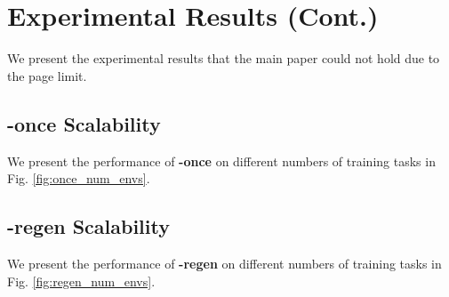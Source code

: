 
\clearpage


\clearpage
\appendix

\section{Experimental Results (Cont.)}
We present the experimental results that the main paper could not hold due to the page limit.

\subsection{\textbf{\agentshort{}-once} Scalability}
We present the performance of \textbf{\agentshort{}-once} on different numbers of training tasks in Fig. \ref{fig:once_num_envs}.

\begin{figure*}[htbp]
\centering
\hfill
{}
\hfill
{}
\hfill
{}
\hfill
{}

\caption{\small \textbf{Generalization Performance of \agentshort{}-once on different numbers of training tasks}: each error bar (95\% confidence interval) is obtained from $20$ independent seed runs.}
\label{fig:once_num_envs}
\end{figure*}

\subsection{\textbf{\agentshort{}-regen} Scalability}
We present the performance of \textbf{\agentshort{}-regen} on different numbers of training tasks in Fig. \ref{fig:regen_num_envs}.

